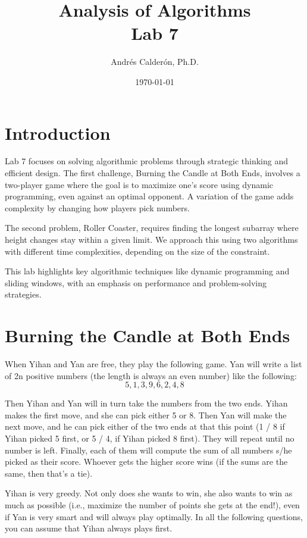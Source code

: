 \documentclass[11pt]{article}
\title{Analysis of Algorithms \\ Lab 7}
\author{Andrés Calderón, Ph.D.}
\date{\today}
\begin{document}
\maketitle

\section{Introduction}

Lab 7 focuses on solving algorithmic problems through strategic thinking and efficient design. The first challenge, Burning the Candle at Both Ends, involves a two-player game where the goal is to maximize one’s score using dynamic programming, even against an optimal opponent. A variation of the game adds complexity by changing how players pick numbers.

The second problem, Roller Coaster, requires finding the longest subarray where height changes stay within a given limit. We approach this using two algorithms with different time complexities, depending on the size of the constraint.

This lab highlights key algorithmic techniques like dynamic programming and sliding windows, with an emphasis on performance and problem-solving strategies.

\section{Burning the Candle at Both Ends}
When Yihan and Yan are free, they play the following game. Yan will write a list of 2n positive numbers (the length is always an even number) like the following:
$$
5, 1, 3, 9, 6, 2, 4, 8
$$

Then Yihan and Yan will in turn take the numbers from the two ends. Yihan makes the first move, and she can pick either 5 or 8. Then Yan will make the next move, and he can pick either of the two ends at that this point (1 / 8 if Yihan picked 5 first, or 5 / 4, if Yihan picked 8 first). They will repeat until no number is left. Finally, each of them will compute the sum of all numbers s/he picked as their score. Whoever gets the higher score wins (if the sums are the same, then that’s a tie).

Yihan is very greedy. Not only does she wants to win, she also wants to win as much as possible (i.e., maximize the number of points she gets at the end!), even if Yan is very smart and will always play optimally.  In all the following questions, you can assume that Yihan always plays first.
\end{document}
